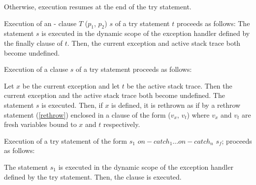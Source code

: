 \documentclass{article}
\newcommand{\code}[1]{{\sf #1}}
\begin{document}
\begin{itemize}
Otherwise, execution resumes at the end of the try statement.

\LMHash{}
Execution of an \ON{}-\CATCH{} clause \code{\ON{} $T$ \CATCH{} ($p_1$, $p_2$)} $s$ of a try statement $t$ proceeds as follows: The statement $s$ is executed in the dynamic scope of the exception handler defined by the finally clause of $t$. Then, the current exception and active stack trace both become undefined.

\LMHash{}
Execution of a \FINALLY{} clause \FINALLY{} $s$ of a try statement proceeds as follows:

\LMHash{}
Let $x$ be the current exception and let $t$ be the active stack trace. Then the current exception and the active stack trace both become undefined. The statement $s$ is executed. Then, if $x$ is defined,  it is rethrown as if by a rethrow statement (\ref{rethrow}) enclosed in a \CATCH{} clause of the form \code{\CATCH{} ($v_x$, $v_t$)} where $v_x$ and $v_t$ are fresh variables bound to $x$ and $t$ respectively.


\LMHash{}
Execution of a try statement of the form \code{\TRY{} $s_1$ $on-catch_1 \ldots on-catch_n$ \FINALLY{} $s_f$;}  proceeds as follows:

\LMHash{}
The statement $s_1$ is executed in the dynamic scope of the exception handler defined by the try statement. Then, the \FINALLY{} clause is executed.



\end{itemize}
\end{document}
